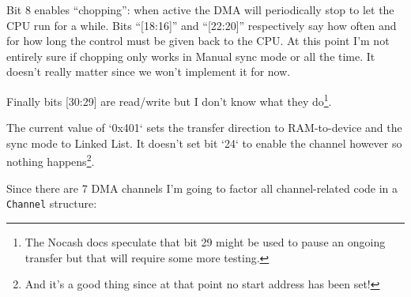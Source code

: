 \documentclass[a4paper]{article}
\newcommand{\code}[1] {\texttt{#1}}
\begin{document}
Bit 8 enables ``chopping'': when active the DMA will periodically stop
to let the CPU run for a while. Bits ``[18:16]'' and ``[22:20]''
respectively say how often and for how long the control must be given
back to the CPU. At this point I'm not entirely sure if chopping only
works in Manual sync mode or all the time. It doesn't really matter
since we won't implement it for now.

Finally bits [30:29] are read/write but I don't know what they
do\footnote{The Nocash docs speculate that bit 29 might be used to
  pause an ongoing transfer but that will require some more testing.}.

The current value of `0x401` sets the transfer direction to
RAM-to-device and the sync mode to Linked List. It doesn't set bit
`24` to enable the channel however so nothing happens\footnote{And
  it's a good thing since at that point no start address has been
  set!}.

Since there are 7 DMA channels I'm going to factor all channel-related
code in a \code{Channel} structure:
\end{document}
